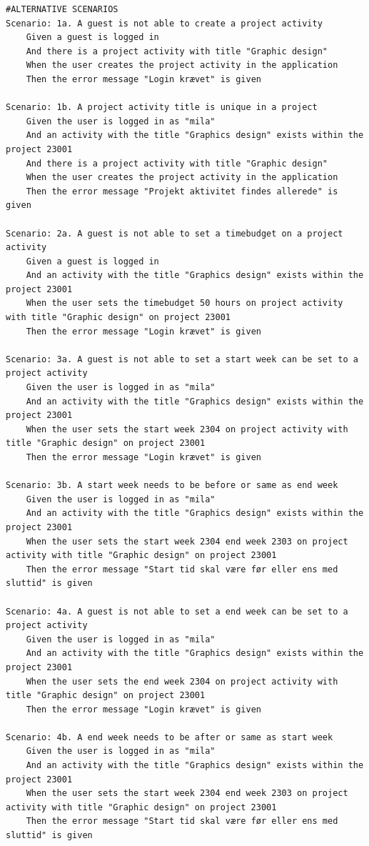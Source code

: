 \begin{listing}[H]
\begin{verbatim}
#ALTERNATIVE SCENARIOS
Scenario: 1a. A guest is not able to create a project activity
    Given a guest is logged in
    And there is a project activity with title "Graphic design"  
    When the user creates the project activity in the application 
    Then the error message "Login krævet" is given

Scenario: 1b. A project activity title is unique in a project
    Given the user is logged in as "mila"
    And an activity with the title "Graphics design" exists within the project 23001
    And there is a project activity with title "Graphic design"  
    When the user creates the project activity in the application 
    Then the error message "Projekt aktivitet findes allerede" is given

Scenario: 2a. A guest is not able to set a timebudget on a project activity
    Given a guest is logged in
    And an activity with the title "Graphics design" exists within the project 23001
    When the user sets the timebudget 50 hours on project activity with title "Graphic design" on project 23001
    Then the error message "Login krævet" is given

Scenario: 3a. A guest is not able to set a start week can be set to a project activity
    Given the user is logged in as "mila"
    And an activity with the title "Graphics design" exists within the project 23001
    When the user sets the start week 2304 on project activity with title "Graphic design" on project 23001
    Then the error message "Login krævet" is given

Scenario: 3b. A start week needs to be before or same as end week
    Given the user is logged in as "mila"
    And an activity with the title "Graphics design" exists within the project 23001
    When the user sets the start week 2304 end week 2303 on project activity with title "Graphic design" on project 23001
    Then the error message "Start tid skal være før eller ens med sluttid" is given

Scenario: 4a. A guest is not able to set a end week can be set to a project activity
    Given the user is logged in as "mila"
    And an activity with the title "Graphics design" exists within the project 23001
    When the user sets the end week 2304 on project activity with title "Graphic design" on project 23001
    Then the error message "Login krævet" is given

Scenario: 4b. A end week needs to be after or same as start week
    Given the user is logged in as "mila"
    And an activity with the title "Graphics design" exists within the project 23001
    When the user sets the start week 2304 end week 2303 on project activity with title "Graphic design" on project 23001
    Then the error message "Start tid skal være før eller ens med sluttid" is given

    \end{verbatim}
\end{listing}


